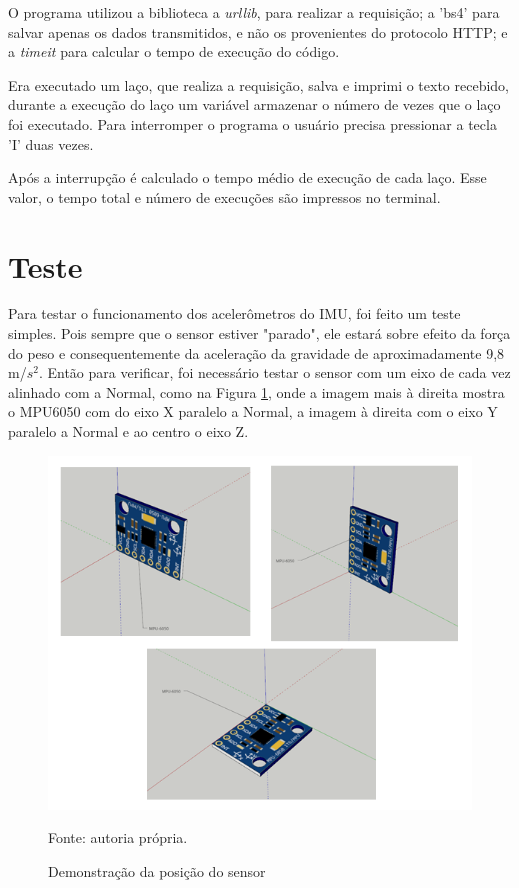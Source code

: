 	O programa utilizou a biblioteca a \textit{urllib}, para realizar a requisição; a 'bs4' para salvar apenas os dados transmitidos, e não os provenientes do protocolo HTTP; e a \textit{timeit} para calcular o tempo de execução do código.
	
	Era executado um laço, que realiza a requisição, salva e imprimi o texto recebido, durante a execução do laço um variável armazenar o número de vezes que o laço foi executado. Para interromper o programa o usuário precisa pressionar a tecla 'I' duas vezes. 
	
	Após a interrupção é calculado o tempo médio de execução de cada laço. Esse valor, o tempo total e número de execuções são impressos  no terminal.

\section {Teste}

	Para testar o funcionamento dos acelerômetros do IMU, foi feito um teste simples. Pois sempre que o sensor estiver "parado", ele estará sobre efeito da força do peso e consequentemente da aceleração da gravidade de aproximadamente 9,8 m/$ s^2 $. Então para verificar, foi necessário testar o sensor com um eixo de cada vez alinhado com a Normal, como na Figura \ref{acel_validation}, onde a imagem mais à direita mostra o MPU6050 com do eixo X paralelo a Normal, a imagem à direita com o eixo Y paralelo a Normal e ao centro o eixo Z.
	
	\begin{figure}[h]
		\centering
		\includegraphics[keepaspectratio=true,scale=0.8]{figuras/validacao_acel.PNG}
		\caption{Demonstração da posição do sensor}
		Fonte: autoria própria. 
		\label{acel_validation}	
	\end{figure}
	
